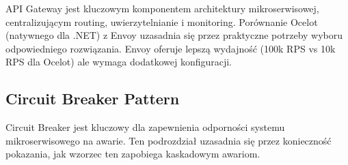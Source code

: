 API Gateway jest kluczowym komponentem architektury mikroserwisowej, centralizującym routing, uwierzytelnianie i monitoring. Porównanie Ocelot (natywnego dla .NET) z Envoy uzasadnia się przez praktyczne potrzeby wyboru odpowiedniego rozwiązania. Envoy oferuje lepszą wydajność (100k RPS vs 10k RPS dla Ocelot) ale wymaga dodatkowej konfiguracji.

\subsection{Circuit Breaker Pattern}
\label{subsec:CircuitBreaker}

Circuit Breaker jest kluczowy dla zapewnienia odporności systemu mikroserwisowego na awarie. Ten podrozdział uzasadnia się przez konieczność pokazania, jak wzorzec ten zapobiega kaskadowym awariom.
